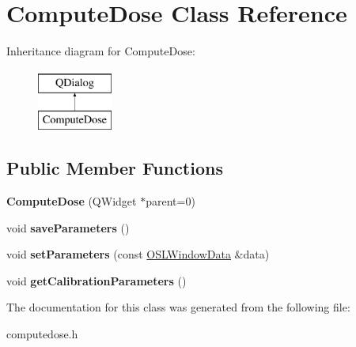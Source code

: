\hypertarget{classComputeDose}{\section{Compute\-Dose Class Reference}
\label{classComputeDose}
}
Inheritance diagram for Compute\-Dose\-:\begin{figure}[H]
\begin{center}
\leavevmode
\includegraphics[height=2.000000cm]{classComputeDose}
\end{center}
\end{figure}
\subsection*{Public Member Functions}
\begin{DoxyCompactItemize}
\item 
\hypertarget{classComputeDose_a4c28473f454af5b692273d96699df207}{{\bfseries Compute\-Dose} (Q\-Widget $\ast$parent=0)}\label{classComputeDose_a4c28473f454af5b692273d96699df207}

\item 
\hypertarget{classComputeDose_a4310a8ce3682c91d122fff749c73b3a0}{void {\bfseries save\-Parameters} ()}\label{classComputeDose_a4310a8ce3682c91d122fff749c73b3a0}

\item 
\hypertarget{classComputeDose_a34136b7daadf6494fd2ac15fa2bab163}{void {\bfseries set\-Parameters} (const \hyperlink{structOSLWindowData}{O\-S\-L\-Window\-Data} \&data)}\label{classComputeDose_a34136b7daadf6494fd2ac15fa2bab163}

\item 
\hypertarget{classComputeDose_a6a9aad07a76f127d1035cefa7a6f9211}{void {\bfseries get\-Calibration\-Parameters} ()}\label{classComputeDose_a6a9aad07a76f127d1035cefa7a6f9211}

\end{DoxyCompactItemize}


The documentation for this class was generated from the following file\-:\begin{DoxyCompactItemize}
\item 
computedose.\-h\end{DoxyCompactItemize}
